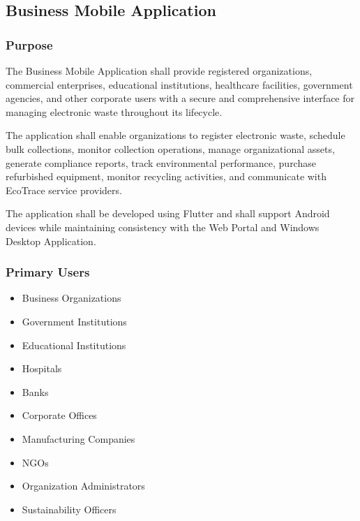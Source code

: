 \subsection{Business Mobile Application}

\subsubsection*{Purpose}

The Business Mobile Application shall provide registered organizations,
commercial enterprises, educational institutions, healthcare facilities,
government agencies, and other corporate users with a secure and
comprehensive interface for managing electronic waste throughout its
lifecycle.

The application shall enable organizations to register electronic waste,
schedule bulk collections, monitor collection operations, manage
organizational assets, generate compliance reports, track environmental
performance, purchase refurbished equipment, monitor recycling
activities, and communicate with EcoTrace service providers.

The application shall be developed using Flutter and shall support
Android devices while maintaining consistency with the Web Portal and
Windows Desktop Application.


\subsubsection*{Primary Users}

\begin{itemize}

\item Business Organizations

\item Government Institutions

\item Educational Institutions

\item Hospitals

\item Banks

\item Corporate Offices

\item Manufacturing Companies

\item NGOs

\item Organization Administrators

\item Sustainability Officers

\end{itemize}

